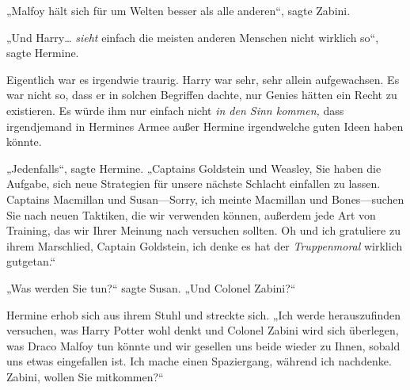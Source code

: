 „Malfoy hält sich für um Welten besser als alle anderen“, sagte Zabini.

„Und Harry… \emph{sieht} einfach die meisten anderen Menschen nicht wirklich so“, sagte Hermine.

Eigentlich war es irgendwie traurig. Harry war sehr, sehr allein aufgewachsen. Es war nicht so, dass er in solchen Begriffen dachte, nur Genies hätten ein Recht zu existieren. Es würde ihm nur einfach nicht \emph{in den Sinn kommen,} dass irgendjemand in Hermines Armee außer Hermine irgendwelche guten Ideen haben könnte.

„Jedenfalls“, sagte Hermine. „Captains Goldstein und Weasley, Sie haben die Aufgabe, sich neue Strategien für unsere nächste Schlacht einfallen zu lassen. Captains Macmillan und Susan—Sorry, ich meinte Macmillan und Bones—suchen Sie nach neuen Taktiken, die wir verwenden können, außerdem jede Art von Training, das wir Ihrer Meinung nach versuchen sollten. Oh und ich gratuliere zu ihrem Marschlied, Captain Goldstein, ich denke es hat der \emph{Truppenmoral} wirklich gutgetan.“

„Was werden Sie tun?“ sagte Susan. „Und Colonel Zabini?“

Hermine erhob sich aus ihrem Stuhl und streckte sich. „Ich werde herauszufinden versuchen, was Harry Potter wohl denkt und Colonel Zabini wird sich überlegen, was Draco Malfoy tun könnte und wir gesellen uns beide wieder zu Ihnen, sobald uns etwas eingefallen ist. Ich mache einen Spaziergang, während ich nachdenke. Zabini, wollen Sie mitkommen?“

